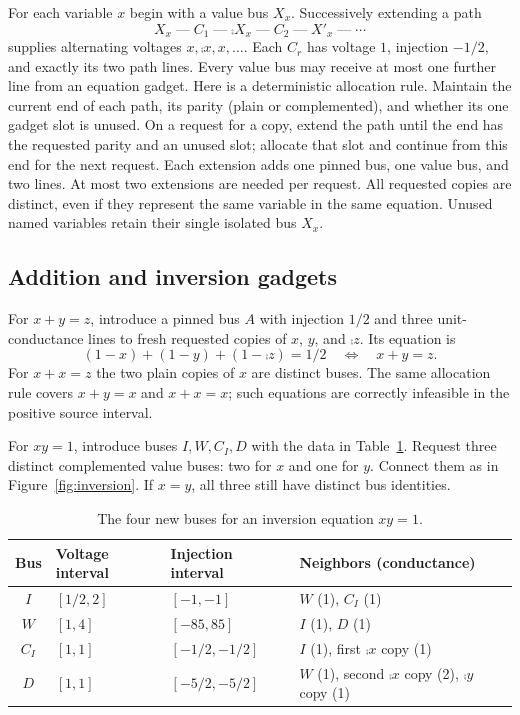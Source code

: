 For each variable $x$ begin with a value bus $X_x$. Successively extending a
path
\begin{equation}
 X_x\mathbin{\text{---}} C_1\mathbin{\text{---}}\comp{X}_x\mathbin{\text{---}}C_2\mathbin{\text{---}}X'_x\mathbin{\text{---}}\cdots
 \label{eq:copy-chain}
\end{equation}
supplies alternating voltages $x,\comp{x},x,\ldots$.
Each $C_r$ has voltage $1$, injection $-1/2$, and exactly its two path lines.
Every value bus may receive at most one further line from an equation gadget.
Here is a deterministic allocation rule. Maintain the current end of each
path, its parity (plain or complemented), and whether its one gadget slot is
unused. On a request for a copy, extend the path until the end has the requested
parity and an unused slot; allocate that slot and continue from this end for
the next request. Each extension adds one pinned bus, one value bus, and two
lines. At most two extensions are needed per request. All requested copies
are distinct, even if they represent the same variable in the same equation.
Unused named variables retain their single isolated bus $X_x$.

\subsection{Addition and inversion gadgets}

For $x+y=z$, introduce a pinned bus $A$ with injection $1/2$ and three
unit-conductance lines to fresh requested copies of $x$, $y$, and
$\comp{z}$. Its equation is
\[
 (1-x)+(1-y)+(1-\comp{z})=1/2
 \quad\Longleftrightarrow\quad x+y=z.
\]
For $x+x=z$ the two plain copies of $x$ are distinct buses. The same allocation
rule covers $x+y=x$ and $x+x=x$; such equations are correctly infeasible in
the positive source interval.

For $xy=1$, introduce buses $I,W,C_I,D$ with the data in
Table~\ref{tab:inversion}. Request three distinct complemented value buses:
two for $x$ and one for $y$. Connect them as in Figure~\ref{fig:inversion}.
If $x=y$, all three still have distinct bus identities.

\begin{table}[htbp]
\centering
\begin{tabular}{@{}clll@{}}
\toprule
Bus & Voltage interval & Injection interval & Neighbors (conductance)\\
\midrule
$I$ & $[1/2,2]$ & $[-1,-1]$ & $W$ (1), $C_I$ (1)\\
$W$ & $[1,4]$ & $[-85,85]$ & $I$ (1), $D$ (1)\\
$C_I$ & $[1,1]$ & $[-1/2,-1/2]$ & $I$ (1), first $\comp{x}$ copy (1)\\
$D$ & $[1,1]$ & $[-5/2,-5/2]$ & $W$ (1), second $\comp{x}$ copy (2), $\comp{y}$ copy (1)\\
\bottomrule
\end{tabular}
\caption{The four new buses for an inversion equation $xy=1$.}
\label{tab:inversion}
\end{table}

